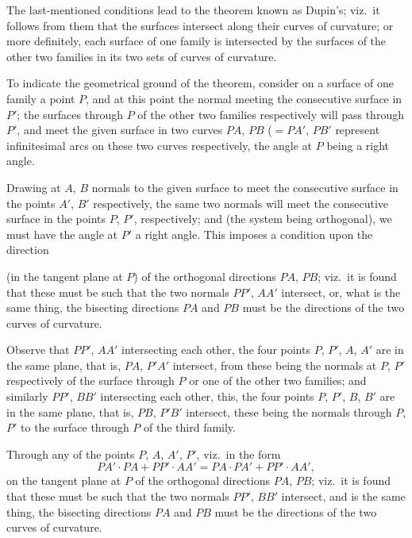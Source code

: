 \documentclass[11pt,a4paper]{article}
\theoremstyle{plain}
\theoremstyle{definition}
\begin{document}
The last-mentioned conditions lead to the theorem known as Dupin's; viz.\ it
follows from them that the surfaces intersect along their curves of curvature; or more
definitely, each surface of one family is intersected by the surfaces of the other two
families in its two sets of curves of curvature.

To indicate the geometrical ground of the theorem, consider on a surface of one
family a point $P$, and at this point the normal meeting the consecutive surface in $P'$;
the surfaces through $P$ of the other two families respectively will pass through $P'$,
and meet the given surface in two curves $PA$, $PB$ ($= PA'$, $PB'$ represent infinitesimal
arcs on these two curves respectively, the angle at $P$ being a right angle.

Drawing at $A$, $B$ normals to the given surface to meet the consecutive surface
in the points $A'$, $B'$ respectively, the same two normals will meet the consecutive
surface in the points $P$, $P'$, respectively; and (the system being orthogonal), we
must have the angle at $P'$ a right angle. This imposes a condition upon the direction

\clearpage

\noindent
(in the tangent plane at $P$) of the orthogonal directions $PA$, $PB$; viz.\ it is found
that these must be such that the two normals $PP'$, $AA'$ intersect, or, what is the same
thing, the bisecting directions $PA$ and $PB$ must be the directions of the two curves of curvature.

Observe that $PP'$, $AA'$ intersecting each other, the four points $P$, $P'$, $A$, $A'$ are
in the same plane, that is, $PA$, $P'A'$ intersect, from these being the normals at $P$, $P'$
respectively of the surface through $P$ or one of the other two families; and similarly
$PP'$, $BB'$ intersecting each other, this, the four points $P$, $P'$, $B$, $B'$ are in
the same plane, that is, $PB$, $P'B'$ intersect, these being the normals through $P$, $P'$ to
the surface through $P$ of the third family.

Through any of the points $P$, $A$, $A'$, $P'$, viz.\ in the form
\[
PA' \cdot PA + PP' \cdot AA' = PA \cdot PA' + PP' \cdot AA',
\]
on the tangent plane at $P$ of the orthogonal directions $PA$, $PB$; viz.\ it is found
that these must be such that the two normals $PP'$, $BB'$ intersect, and is the same
thing, the bisecting directions $PA$ and $PB$ must be the directions of the two curves
of curvature.
\end{document}
